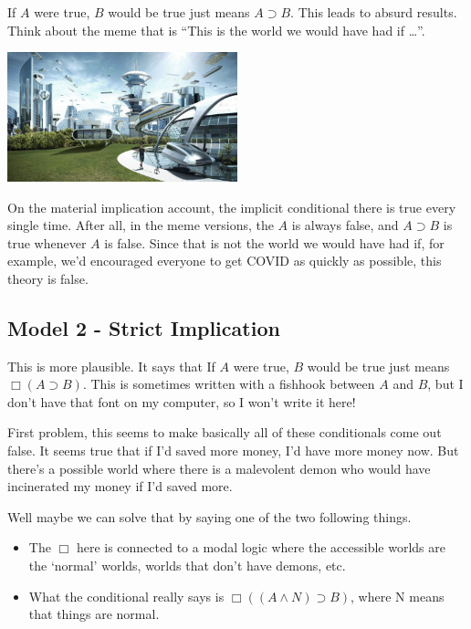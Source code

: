 \documentclass[
]{article}
\providecommand{\tightlist}{%
  \setlength{\itemsep}{0pt}\setlength{\parskip}{0pt}}\usepackage{longtable,booktabs,array}
\begin{document}
If \(A\) were true, \(B\) would be true just means \(A \supset B\). This
leads to absurd results. Think about the meme that is ``This is the
world we would have had if \ldots{}''.

\includegraphics[width=0.5\textwidth,height=\textheight]{future.jpg}

On the material implication account, the implicit conditional there is
true every single time. After all, in the meme versions, the \(A\) is
always false, and \(A \supset B\) is true whenever \(A\) is false. Since
that is not the world we would have had if, for example, we'd encouraged
everyone to get COVID as quickly as possible, this theory is false.

\hypertarget{model-2---strict-implication}{%
\subsection{Model 2 - Strict
Implication}\label{model-2---strict-implication}}

This is more plausible. It says that If \(A\) were true, \(B\) would be
true just means \(\Box(A \supset B)\). This is sometimes written with a
fishhook between \(A\) and \(B\), but I don't have that font on my
computer, so I won't write it here!

First problem, this seems to make basically all of these conditionals
come out false. It seems true that if I'd saved more money, I'd have
more money now. But there's a possible world where there is a malevolent
demon who would have incinerated my money if I'd saved more.

Well maybe we can solve that by saying one of the two following things.

\begin{itemize}
\tightlist
\item
  The \(\Box\) here is connected to a modal logic where the accessible
  worlds are the `normal' worlds, worlds that don't have demons, etc.
\item
  What the conditional really says is \(\Box((A \wedge N) \supset B)\),
  where N means that things are normal.
\end{itemize}
\end{document}
